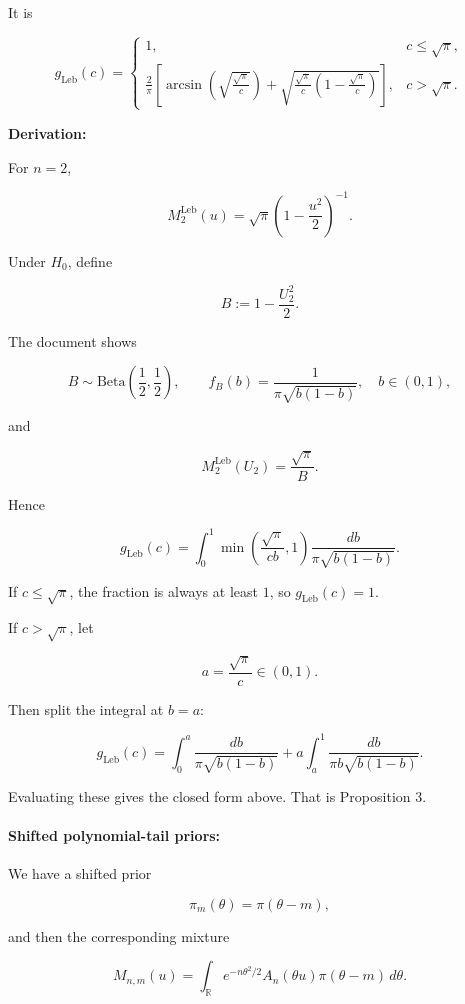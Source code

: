 \documentclass{article}%
\begin{document}
It is

\[
g_{\mathrm{Leb}}(c)
=
\begin{cases}
1, & c\le \sqrt{\pi},\\[1ex]
\displaystyle
\frac{2}{\pi}
\left[
\arcsin\!\left(\sqrt{\frac{\sqrt\pi}{c}}\right)
+
\sqrt{\frac{\sqrt\pi}{c}\left(1-\frac{\sqrt\pi}{c}\right)}
\right],
& c>\sqrt{\pi}.
\end{cases}
\]


\textbf{Derivation:}


For \(n=2\),

\[
M_2^{\mathrm{Leb}}(u)=\sqrt{\pi}\left(1-\frac{u^2}{2}\right)^{-1}.
\]

Under \(H_0\), define

\[
B:=1-\frac{U_2^2}{2}.
\]

The document shows

\[
B\sim \mathrm{Beta}\!\left(\frac12,\frac12\right),
\qquad
f_B(b)=\frac{1}{\pi\sqrt{b(1-b)}},\quad b\in(0,1),
\]

and

\[
M_2^{\mathrm{Leb}}(U_2)=\frac{\sqrt{\pi}}{B}.
\]

Hence

\[
g_{\mathrm{Leb}}(c)
=
\int_0^1
\min\!\left(\frac{\sqrt{\pi}}{cb},1\right)
\frac{db}{\pi\sqrt{b(1-b)}}.
\]

If \(c\le \sqrt\pi\), the fraction is always at least \(1\), so \(g_{\mathrm{Leb}}(c)=1\).

If \(c>\sqrt\pi\), let

\[
a=\frac{\sqrt\pi}{c}\in(0,1).
\]

Then split the integral at \(b=a\):

\[
g_{\mathrm{Leb}}(c)
=
\int_0^a \frac{db}{\pi\sqrt{b(1-b)}}
+
a\int_a^1 \frac{db}{\pi b\sqrt{b(1-b)}}.
\]

Evaluating these gives the closed form above. That is Proposition 3.


\paragraph{Shifted polynomial-tail priors:}

We have a shifted prior

\[
\pi_m(\theta)=\pi(\theta-m),
\]

and then the corresponding mixture

\[
M_{n,m}(u)
=
\int_{\mathbb R} e^{-n\theta^2/2}A_n(\theta u)\pi(\theta-m)\,d\theta.
\]
\end{document}
